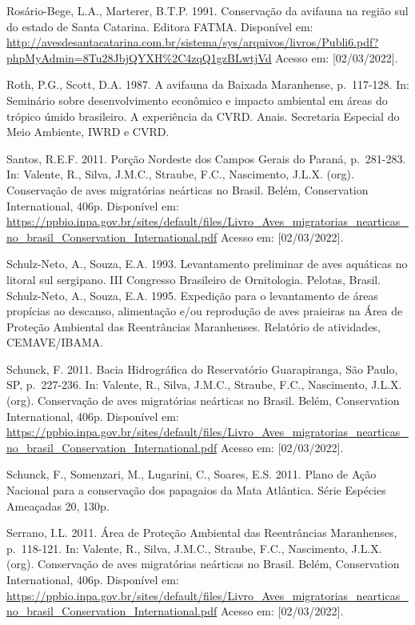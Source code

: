 \documentclass[
  oneside]{scrbook}
\begin{document}
Rosário-Bege, L.A., Marterer, B.T.P. 1991. Conservação da avifauna na região sul do estado de Santa Catarina. Editora FATMA. Disponível em: \url{http://avesdesantacatarina.com.br/sistema/sys/arquivos/livros/Publi6.pdf?phpMyAdmin=8Tu28JbjQYXH\%2C4zqQ1gzBLwtjVd} Acesso em: {[}02/03/2022{]}.

Roth, P.G., Scott, D.A. 1987. A avifauna da Baixada Maranhense, p.~117-128. In: Seminário sobre desenvolvimento econômico e impacto ambiental em áreas do trópico úmido brasileiro. A experiência da CVRD. Anais. Secretaria Especial do Meio Ambiente, IWRD e CVRD.

Santos, R.E.F. 2011. Porção Nordeste dos Campos Gerais do Paraná, p.~281-283. In: Valente, R., Silva, J.M.C., Straube, F.C., Nascimento, J.L.X. (org). Conservação de aves migratórias neárticas no Brasil. Belém, Conservation International, 406p. Disponível em: \url{https://ppbio.inpa.gov.br/sites/default/files/Livro_Aves_migratorias_nearticas_no_brasil_Conservation_International.pdf} Acesso em: {[}02/03/2022{]}.

Schulz-Neto, A., Souza, E.A. 1993. Levantamento preliminar de aves aquáticas no litoral sul sergipano. III Congresso Brasileiro de Ornitologia. Pelotas, Brasil.
Schulz-Neto, A., Souza, E.A. 1995. Expedição para o levantamento de áreas propícias ao descanso, alimentação e/ou reprodução de aves praieiras na Área de Proteção Ambiental das Reentrâncias Maranhenses. Relatório de atividades, CEMAVE/IBAMA.

Schunck, F. 2011. Bacia Hidrográfica do Reservatório Guarapiranga, São Paulo, SP, p.~227-236. In: Valente, R., Silva, J.M.C., Straube, F.C., Nascimento, J.L.X. (org). Conservação de aves migratórias neárticas no Brasil. Belém, Conservation International, 406p. Disponível em: \url{https://ppbio.inpa.gov.br/sites/default/files/Livro_Aves_migratorias_nearticas_no_brasil_Conservation_International.pdf} Acesso em: {[}02/03/2022{]}.

Schunck, F., Somenzari, M., Lugarini, C., Soares, E.S. 2011. Plano de Ação Nacional para a conservação dos papagaios da Mata Atlântica. Série Espécies Ameaçadas 20, 130p.

Serrano, I.L. 2011. Área de Proteção Ambiental das Reentrâncias Maranhenses, p.~118-121. In: Valente, R., Silva, J.M.C., Straube, F.C., Nascimento, J.L.X. (org). Conservação de aves migratórias neárticas no Brasil. Belém, Conservation International, 406p. Disponível em: \url{https://ppbio.inpa.gov.br/sites/default/files/Livro_Aves_migratorias_nearticas_no_brasil_Conservation_International.pdf} Acesso em: {[}02/03/2022{]}.
\end{document}
